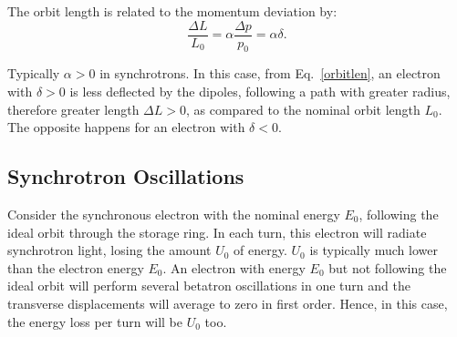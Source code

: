 The orbit length is related to the momentum deviation by:
\begin{equation}
    \frac{\Delta L}{L_0} = \alpha \dfrac{\Delta p}{p_0} = \alpha \delta.
    \label{orbitlen}
\end{equation}

Typically $\alpha > 0$ in synchrotrons. In this case, from Eq.~\eqref{orbitlen}, an electron with $\delta > 0$ is less deflected by the dipoles, following a path with greater radius, therefore greater length $\Delta L > 0$, as compared to the nominal orbit length $L_0$. The opposite happens for an electron with $\delta < 0$. 

\subsection{Synchrotron Oscillations}
Consider the synchronous electron with the nominal energy $E_0$, following the ideal orbit through the storage ring. In each turn, this electron will radiate synchrotron light, losing the amount $U_0$ of energy. $U_0$ is typically much lower than the electron energy $E_0$. An electron with energy $E_0$ but not following the ideal orbit will perform several betatron oscillations in one turn and the transverse displacements will average to zero in first order. Hence, in this case, the energy loss per turn will be $U_0$ too. 

